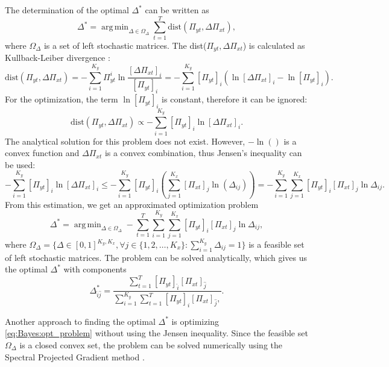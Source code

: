 \documentclass{aip-cp}
\DeclareMathOperator*{\argmin}{arg\,min}
\begin{document}
The determination of the optimal $\Delta^{*}$ can be written as
\begin{equation}
    \Delta^* = \argmin_{\Delta \in \Omega_{\Delta}} \sum_{t=1}^{T} \text{dist}(\Pi_{yt}, \Delta\Pi_{xt}),
    \label{eq:Bayes:opt_problem}
\end{equation}
where $\Omega_{\Delta}$ is a set of left stochastic matrices. The dist($\Pi_{yt}, \Delta\Pi_{xt}$) is calculated as Kullback-Leiber divergence \cite{Kullback1951}:
\begin{equation}
    \text{dist}(\Pi_{yt}, \Delta\Pi_{xt}) = - \sum_{i=1}^{K_y} \Pi_{yt}^i \ln\frac{[\Delta\Pi_{xt}]_i}{[\Pi_{yt}]_i} = - \sum_{i=1}^{K_y} [\Pi_{yt}]_i (\ln [\Delta\Pi_{xt}]_i - \ln [\Pi_{yt}]_i).
\end{equation}
For the optimization, the term $\ln [\Pi_{yt}]_i$ is constant, therefore it can be ignored:
\begin{equation}
    \text{dist}(\Pi_{yt}, \Delta\Pi_{xt}) \propto - \sum_{i=1}^{K_y} [\Pi_{yt}]_i \ln [\Delta\Pi_{xt}]_i.
\end{equation}
The analytical solution for this problem does not exist. However, $-\ln()$ is a convex function and $\Delta\Pi_{xt}$ is a convex combination, thus Jensen's inequality can be used:
\begin{equation}
    - \sum_{i=1}^{K_y} [\Pi_{yt}]_i \ln [\Delta\Pi_{xt}]_i \leq - \sum_{i=1}^{K_y} [\Pi_{yt}]_i ( \sum_{j=1}^{K_x} [\Pi_{xt}]_j \ln (\Delta_{ij}) ) = - \sum_{i=1}^{K_y} \sum_{j=1}^{K_x} [\Pi_{yt}]_i [\Pi_{xt}]_j \ln \Delta_{ij}.
\end{equation}
From this estimation, we get an approximated optimization problem
\begin{equation}
    \Delta^* = \argmin_{\Delta \in \Omega_{\Delta}} - \sum_{t=1}^{T} \sum_{i=1}^{K_y} \sum_{j=1}^{K_x} [\Pi_{yt}]_i [\Pi_{xt}]_j \ln \Delta_{ij},
\end{equation}
where $\Omega_{\Delta} = \{ \Delta \in [0, 1]^{K_y,K_x}, \forall j \in \{ 1, 2, \dots, K_x \} : \sum_{i=1}^{K_y} \Delta_{ij} = 1 \}$
is a feasible set of left stochastic matrices. The problem can be solved analytically, which gives us the optimal $\Delta^*$ with components
\begin{equation}
    \Delta_{\hat{i}\hat{j}}^{*} = \frac{\sum_{t=1}^{T} [\Pi_{yt}]_{\hat{i}} [\Pi_{xt}]_{\hat{j}}}{\sum_{i=1}^{K_y} \sum_{t=1}^{T} [\Pi_{yt}]_{i} [\Pi_{xt}]_{\hat{j}},}.
\end{equation}

Another approach to finding the optimal $\Delta^{*}$ is optimizing \eqref{eq:Bayes:opt_problem} without using the Jensen inequality. Since the feasible set $\Omega_{\Delta}$ is a closed convex set, the problem can be solved numerically using the Spectral Projected Gradient method \cite{birgin2000}.
\end{document}
